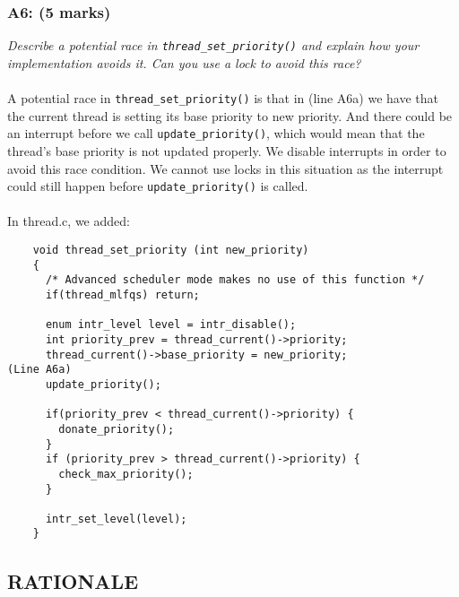 \documentclass{article}
\begin{document}
\subsubsection*{A6: (5 marks) }
\textit{Describe a potential race in \texttt{thread\_set\_priority()} and explain how your implementation avoids it.  Can you use a lock to avoid this race?}
\\ \\
A potential race in \texttt{thread\_set\_priority()} is that in (line A6a) we have that the current thread is setting its base priority to new priority. And there could be an interrupt before we call \texttt{update\_priority()}, which would mean that the thread's base priority is not updated properly. We disable interrupts in order to avoid this race condition. We cannot use locks in this situation as the interrupt could still happen before \texttt{update\_priority()} is called.
\\ \\
In thread.c, we added:
\begin{lstlisting}
    void thread_set_priority (int new_priority)
    {
      /* Advanced scheduler mode makes no use of this function */
      if(thread_mlfqs) return;

      enum intr_level level = intr_disable();
      int priority_prev = thread_current()->priority;
      thread_current()->base_priority = new_priority;                                   (Line A6a)
      update_priority();

      if(priority_prev < thread_current()->priority) {
        donate_priority();
      }
      if (priority_prev > thread_current()->priority) {
        check_max_priority();
      }

      intr_set_level(level);
    }
\end{lstlisting}


\subsection{RATIONALE}
\end{document}
